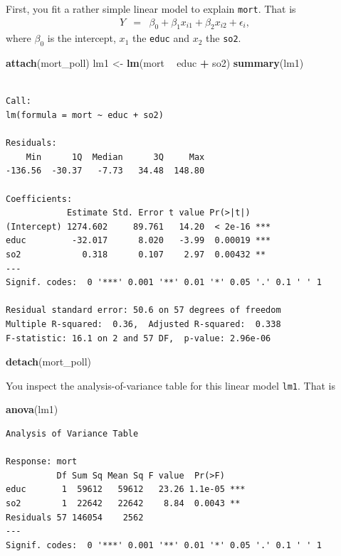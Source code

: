 \documentclass[
]{book}
\newenvironment{Shaded}{\begin{snugshade}}{\end{snugshade}}
\newcommand{\KeywordTok}[1]{\textcolor[rgb]{0.13,0.29,0.53}{\textbf{#1}}}
\newcommand{\NormalTok}[1]{#1}
\newcommand{\OperatorTok}[1]{\textcolor[rgb]{0.81,0.36,0.00}{\textbf{#1}}}
\newcommand{\StringTok}[1]{\textcolor[rgb]{0.31,0.60,0.02}{#1}}
\begin{document}
First, you fit a rather simple linear model to explain \texttt{mort}. That is
\begin{eqnarray*}
Y &=& \beta_0 + \beta_1 x_{i1} + \beta_2 x_{i2} + \epsilon_i,
\end{eqnarray*}
where \(\beta_0\) is the intercept, \(x_1\) the \texttt{educ} and \(x_2\) the \texttt{so2}.

\begin{Shaded}
\begin{Highlighting}[]
\KeywordTok{attach}\NormalTok{(mort_poll)}
\NormalTok{lm1 <-}\StringTok{ }\KeywordTok{lm}\NormalTok{(mort }\OperatorTok{~}\StringTok{ }\NormalTok{educ }\OperatorTok{+}\StringTok{ }\NormalTok{so2)}
\KeywordTok{summary}\NormalTok{(lm1)}
\end{Highlighting}
\end{Shaded}

\begin{verbatim}

Call:
lm(formula = mort ~ educ + so2)

Residuals:
    Min      1Q  Median      3Q     Max 
-136.56  -30.37   -7.73   34.48  148.80 

Coefficients:
            Estimate Std. Error t value Pr(>|t|)    
(Intercept) 1274.602     89.761   14.20  < 2e-16 ***
educ         -32.017      8.020   -3.99  0.00019 ***
so2            0.318      0.107    2.97  0.00432 ** 
---
Signif. codes:  0 '***' 0.001 '**' 0.01 '*' 0.05 '.' 0.1 ' ' 1

Residual standard error: 50.6 on 57 degrees of freedom
Multiple R-squared:  0.36,	Adjusted R-squared:  0.338 
F-statistic: 16.1 on 2 and 57 DF,  p-value: 2.96e-06
\end{verbatim}

\begin{Shaded}
\begin{Highlighting}[]
\KeywordTok{detach}\NormalTok{(mort_poll)}
\end{Highlighting}
\end{Shaded}

You inspect the analysis-of-variance table for this linear model \texttt{lm1}. That is

\begin{Shaded}
\begin{Highlighting}[]
\KeywordTok{anova}\NormalTok{(lm1)}
\end{Highlighting}
\end{Shaded}

\begin{verbatim}
Analysis of Variance Table

Response: mort
          Df Sum Sq Mean Sq F value  Pr(>F)    
educ       1  59612   59612   23.26 1.1e-05 ***
so2        1  22642   22642    8.84  0.0043 ** 
Residuals 57 146054    2562                    
---
Signif. codes:  0 '***' 0.001 '**' 0.01 '*' 0.05 '.' 0.1 ' ' 1
\end{verbatim}
\end{document}
